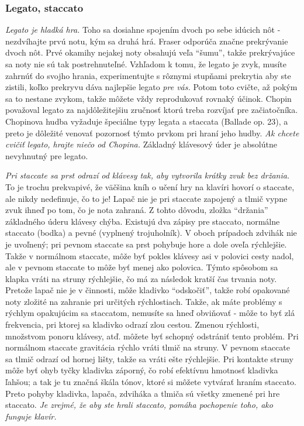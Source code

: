\subsubsection{Legato, staccato}
\emph{Legato je hladká hra.} Toho sa dosiahne spojením dvoch po sebe idúcich nôt - nezdvíhajte prvú notu, kým sa druhá hrá. Fraser odporúča značne prekrývanie dvoch nôt. Prvé okamihy nejakej noty obsahujú veľa “šumu”, takže prekrývajúce sa noty nie sú tak postrehnuteľné. Vzhľadom k tomu, že legato je zvyk, musíte zahrnúť do svojho hrania, experimentujte s rôznymi stupňami prekrytia aby ste zistili, koľko prekryvu dáva najlepšie legato \textit{pre vás.} Potom toto cvičte, až pokým sa to nestane zvykom, takže môžete vždy reprodukovať rovnaký účinok. Chopin považoval legato za najdôležitejšiu zručnosť ktorú treba rozvíjať pre začiatočníka. Chopinova hudba vyžaduje špeciálne typy legata a staccata (Ballade op. 23), a preto je dôležité venovať pozornosť týmto prvkom pri hraní jeho hudby. \emph{Ak chcete cvičiť legato, hrajte niečo od Chopina.} Základný klávesový úder je absolútne nevyhnutný pre legato.

\emph{Pri staccate sa prst odrazí od klávesy tak, aby vytvorila krátky zvuk bez držania.} To je trochu prekvapivé, že väčšina kníh o učení hry na klavíri hovorí o staccate, ale nikdy nedefinuje, čo to je! Lapač nie je pri staccate zapojený a tlmič vypne zvuk ihneď po tom, čo je nota zahraná. Z tohto dôvodu, zložka “držania” základného úderu klávesy chýba. Existujú dva zápisy pre staccato, normálne staccato (bodka) a pevné (vyplnený trojuholník). V oboch prípadoch zdvihák nie je uvoľnený; pri pevnom staccate sa prst pohybuje hore a dole oveľa rýchlejšie. Takže v normálnom staccate, môže byť pokles klávesy asi v polovici cesty nadol, ale v pevnom staccate to môže byť menej ako polovica. Týmto spôsobom sa klapka vráti na struny rýchlejšie, čo má za následok kratší čas trvania noty. Pretože lapač nie je v činnosti, môže kladivko “odskočiť”, takže robí opakované noty zložité na zahranie pri určitých rýchlostiach. Takže, ak máte problémy s rýchlym opakujúcim sa staccatom, nemusíte sa hneď obviňovať - môže to byť zlá frekvencia, pri ktorej sa kladivko odrazí zlou cestou. Zmenou rýchlosti, množstvom ponoru klávesy, atď. môžete byť schopný odstrániť tento problém. Pri normálnom staccate gravitácia rýchlo vráti tlmič na struny. V pevnom staccate sa tlmič odrazí od hornej lišty, takže sa vráti ešte rýchlejšie. Pri kontakte struny môže byť ohyb tyčky kladivka záporný, čo robí efektívnu hmotnosť kladivka ľahšou; a tak je tu značná škála tónov, ktoré si môžete vytvárať hraním staccato. Preto pohyby kladivka, lapača, zdviháka a tlmiča sú všetky zmenené pri hre staccato. \emph{Je zrejmé, že aby ste hrali staccato, pomáha pochopenie toho, ako funguje klavír.}

